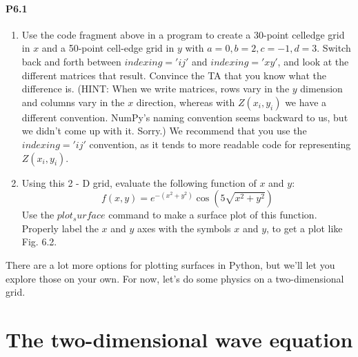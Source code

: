 \paragraph*{P6.1} 

\begin{enumerate}[label=(\alph*)]
\item
Use the code fragment above in a program to create a 30-point celledge grid in $x$ and a 50-point cell-edge grid in $y$ with $a = 0, b = 2,
c = −1, d = 3$. Switch back and forth between $indexing='ij'$ and
$indexing='xy'$, and look at the different matrices that result. Convince the TA that you know what the difference is. (HINT: When
we write matrices, rows vary in the $y$ dimension and columns vary
in the $x$ direction, whereas with $Z(x_i, y_i)$ we have a different convention. NumPy\rq s naming convention seems backward to us, but
we didn\rq t come up with it. Sorry.) We recommend that you use the
$indexing='ij'$ convention, as it tends to more readable code for representing $Z(x_i, y_i)$.
\item  Using this 2 - D grid, evaluate the following function of $x$ and $y$:
\begin{equation}\label{eq:61}
f(x,y) = e^{-(x^2+y^2)} \cos(5\sqrt{x^2+y^2})
\end{equation}
Use the $plot_surface$ command to make a surface plot of this function. Properly label the $x$ and $y$ axes with the symbols $x$ and $y$, to get
a plot like Fig. 6.2.
\end{enumerate}
There are a lot more options for plotting surfaces in Python, but we\rq ll let you
explore those on your own. For now, let\rq s do some physics on a two-dimensional
grid.
\section*{The two-dimensional wave equation}


